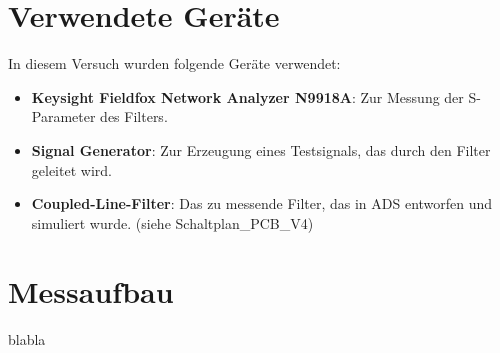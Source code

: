
\section{Verwendete Geräte}
In diesem Versuch wurden folgende Geräte verwendet:
\begin{itemize}
    \item \textbf{Keysight Fieldfox Network Analyzer N9918A}: Zur Messung der S-Parameter des Filters.
    \item \textbf{Signal Generator}: Zur Erzeugung eines Testsignals, das durch den Filter geleitet wird.
    \item \textbf{Coupled-Line-Filter}: Das zu messende Filter, das in ADS entworfen und simuliert wurde. (siehe Schaltplan\_PCB\_V4)
\end{itemize}
\section{Messaufbau}
blabla
\clearpage